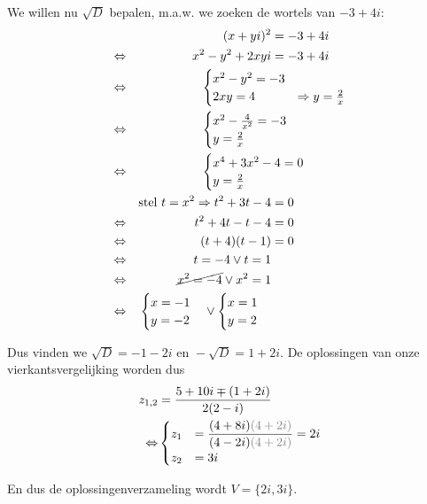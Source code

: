 \documentclass[12pt,twoside,a4]{article}
\begin{document}
We willen nu $\sqrt{D}$ bepalen, m.a.w. we zoeken de wortels van $-3+4i$:
\begin{align*}
  &&(x+yi)^2 &= -3+4i\\
  \LRA &&x^2 - y^2 + 2xyi &= -3+4i\\
  \LRA && &\hspace*{-2cm}\begin{cases}x^2 - y^2 = -3\\2xy =  4 &\Rightarrow y=\frac{2}{x} \end{cases}\\
  \LRA && &\hspace*{-2cm}\begin{cases}x^2 - \frac{4}{x^2} = -3\\y =  \frac{2}{x}\end{cases}\\
  \LRA && &\hspace*{-2cm}\begin{cases}x^4+3x^2-4=0\\y =  \frac{2}{x}\end{cases}\\
  &&\mbox{stel } t=x^2
  \Rightarrow t^2+3t-4&=0\\
  \LRA && t^2+4t-t-4 &= 0\\
  \LRA && (t+4)(t-1) &= 0\\
  \LRA && t=-4 \vee t=1\\
  \LRA && \cancel{x^2=-4}\vee x^2=1\\
  \LRA && \begin{cases}x=-1\\y=-2\end{cases} \vee \begin{cases}x=1\\y=2\end{cases}
\end{align*}

Dus vinden we $\sqrt{D} = -1-2i \mbox{ en } -\sqrt{D}=1+2i$. De oplossingen van onze vierkantsvergelijking worden dus
\begin{align*}
  z_{1,2} &= \dfrac{5+10i \mp (1+2i)}{2(2-i)}\\
  \LRA & \begin{cases}z_1 &= \dfrac{(4+8i){\color{gray}(4+2i)}}{(4-2i){\color{gray}(4+2i)}}=2i\\z_2 &= 3i\end{cases}
\end{align*}

En dus de oplossingenverzameling wordt $V=\{2i, 3i\}$.
\end{document}
